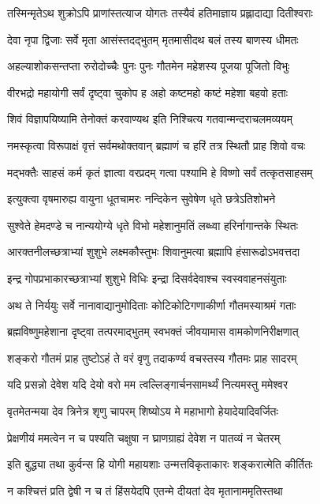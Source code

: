 \twolineshloka
{तस्मिन्मृतेऽथ शुक्रोऽपि प्राणांस्तत्याज योगतः}
{तस्यैवं हतिमाज्ञाय प्रह्लादाद्या दितीश्वराः}%

\twolineshloka
{देवा नृपा द्विजाः सर्वे मृता आसंस्तदद्भुतम्}
{मृतमासीदथ बलं तस्य बाणस्य धीमतः}%

\twolineshloka
{अहल्याशोकसन्तप्ता रुरोदोच्चैः पुनः पुनः}
{गौतमेन महेशस्य पूजया पूजितो विभुः}%

\twolineshloka
{वीरभद्रो महायोगी सर्वं दृष्ट्वा चुकोप ह}
{अहो कष्टमहो कष्टं महेशा बहवो हताः}%

\twolineshloka
{शिवं विज्ञापयिष्यामि तेनोक्तं करवाण्यथ}
{इति निश्चित्य गतवान्मन्दराचलमव्ययम्}%

\twolineshloka
{नमस्कृत्वा विरूपाक्षं वृत्तं सर्वमथोक्तवान्}
{ब्रह्माणं च हरिं तत्र स्थितौ प्राह शिवो वचः}%

\twolineshloka
{मद्भक्तैः साहसं कर्म कृतं ज्ञात्वा वरप्रदम्}
{गत्वा पश्यामि हे विष्णो सर्वं तत्कृतसाहसम्}%

\twolineshloka
{इत्युक्त्वा वृषमारुह्य वायुना धूतचामरः}
{नन्दिकेन सुवेषेण धृते छत्रेऽतिशोभने}%

\twolineshloka
{सुश्वेते हेमदण्डे च नान्ययोग्ये धृते विभो}
{महेशानुमतिं लब्ध्वा हरिर्नागान्तके स्थितः}%

\twolineshloka
{आरक्तनीलच्छत्राभ्यां शुशुभे लक्ष्मकौस्तुभः}
{शिवानुमत्या ब्रह्मापि हंसारूढोऽभवत्तदा}%

\twolineshloka
{इन्द्र गोपप्रभाकारच्छत्राभ्यां शुशुभे विधिः}
{इन्द्रा दिसर्वदेवाश्च स्वस्ववाहनसंयुताः}%

\twolineshloka
{अथ ते निर्ययुः सर्वे नानावाद्यानुमोदिताः}
{कोटिकोटिगणाकीर्णा गौतमस्याश्रमं गताः}%

\twolineshloka
{ब्रह्मविष्णुमहेशाना दृष्ट्वा तत्परमाद्भुतम्}
{स्वभक्तं जीवयामास वामकोणनिरीक्षणात्}%

\twolineshloka
{शङ्करो गौतमं प्राह तुष्टोऽहं ते वरं वृणु}
{तदाकर्ण्य वचस्तस्य गौतमः प्राह सादरम्}%

\twolineshloka
{यदि प्रसन्नो देवेश यदि देयो वरो मम}
{त्वल्लिङ्गार्चनसामर्थ्यं नित्यमस्तु ममेश्वर}%

\twolineshloka
{वृतमेतन्मया देव त्रिनेत्र शृणु चापरम्}
{शिष्योऽय मे महाभागो हेयादेयादिवर्जितः}%

\twolineshloka
{प्रेक्षणीयं ममत्वेन न च पश्यति चक्षुषा}
{न घ्राणग्राह्यं देवेश न पातव्यं न चेतरम्}%

\twolineshloka
{इति बुद्ध्या तथा कुर्वन्स हि योगी महायशाः}
{उन्मत्तविकृताकारः शङ्करात्मेति कीर्तितः}%

\twolineshloka
{न कश्चित्तं प्रति द्वेषी न च तं हिंसयेदपि}
{एतन्मे दीयतां देव मृतानाममृतिस्तथा}%

